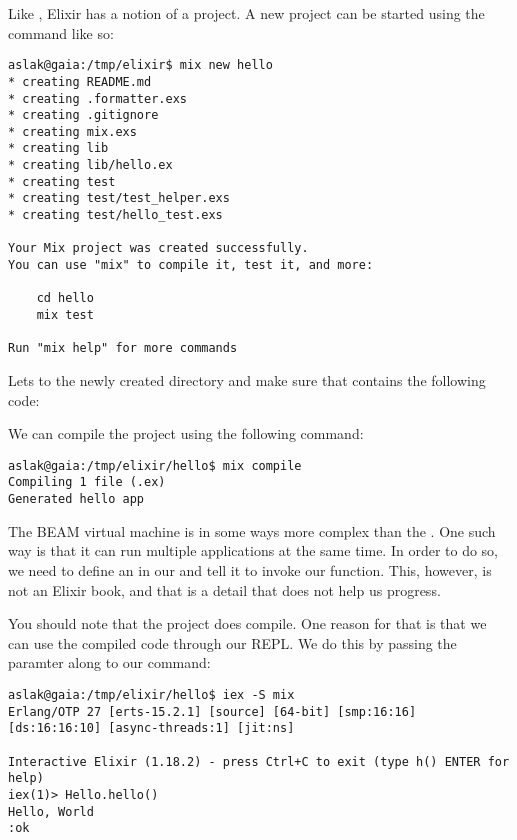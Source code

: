Like \csharp, Elixir has a notion of a project. A new project can be started using the  command like so:

\begin{verbatim}
aslak@gaia:/tmp/elixir$ mix new hello
* creating README.md
* creating .formatter.exs
* creating .gitignore
* creating mix.exs
* creating lib
* creating lib/hello.ex
* creating test
* creating test/test_helper.exs
* creating test/hello_test.exs

Your Mix project was created successfully.
You can use "mix" to compile it, test it, and more:

    cd hello
    mix test

Run "mix help" for more commands
\end{verbatim}

Lets  to the newly created directory and make sure that  contains the following code:


We can compile the project using the following  command:

\begin{verbatim}
aslak@gaia:/tmp/elixir/hello$ mix compile
Compiling 1 file (.ex)
Generated hello app
\end{verbatim}

The BEAM virtual machine is in some ways more complex than the . One such way is that it can run multiple applications at the same time. In order to do so, we need to define an  in our  and tell it to invoke our  function. This, however, is not an Elixir book, and that is a detail that does not help us progress.

You should note that the project does compile. One reason for that is that we can use the compiled code through our REPL. We do this by passing the  paramter along to our  command:

\begin{verbatim}
aslak@gaia:/tmp/elixir/hello$ iex -S mix
Erlang/OTP 27 [erts-15.2.1] [source] [64-bit] [smp:16:16] [ds:16:16:10] [async-threads:1] [jit:ns]

Interactive Elixir (1.18.2) - press Ctrl+C to exit (type h() ENTER for help)
iex(1)> Hello.hello()
Hello, World
:ok
\end{verbatim}


